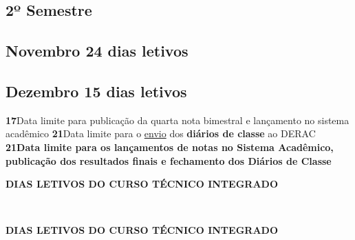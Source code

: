 \documentclass[thesis]{hmcposter}
\begin{document}
\begin{poster}
\section{\hfill \color{hmcorange}2º Semestre}
\subsection{Novembro \hfill 24 dias letivos}\subsection{Dezembro \hfill 15 dias letivos}\textbf{17}\qquad Data limite para publicação da quarta nota bimestral e lançamento no sistema acadêmico \newline \null\textbf{21}\qquad Data limite para o \underline{envio} dos \textbf{diários de classe} ao DERAC \newline \null\textbf{21}\qquad \textbf{Data limite para os lançamentos de notas no Sistema Acadêmico, publicação dos resultados finais e fechamento dos Diários de Classe} \newline \null\newpage
~
\vfill
\begin{center}
\large \textbf{DIAS LETIVOS DO CURSO TÉCNICO INTEGRADO}
\newline
\null
\newline
\begin{table}
\centering
{}
\end{table}
\newline
\null
\newline
\end{center}
\vfill
\null
\columnbreak
~
\vfill
\begin{center}
\large \textbf{DIAS LETIVOS DO CURSO TÉCNICO INTEGRADO}
\newline
\null
\newline
\begin{table}

\end{table}
\end{center}
\end{poster}
\end{document}
